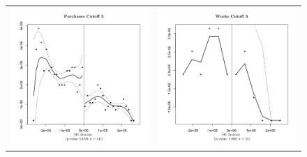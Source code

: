 \documentclass[11pt]{article}
\begin{document}
\begin{figure}[!htbp]
\begin{tabular}{cc}
  \includegraphics[scale=.41]{purchasesmanipulation3} & \includegraphics[scale=.41]{worksmanipulation3} \\
  \end{tabular}
\end{figure}
\end{document}
